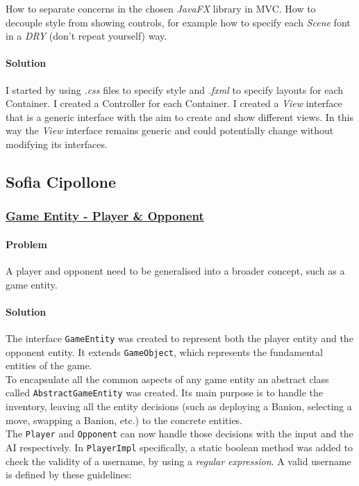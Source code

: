 \documentclass[12pt, a4paper]{report}
\theoremstyle{definition}
\begin{document}
            How to separate concerns in the chosen \emph{JavaFX} library in MVC.
            How to decouple style from showing controls, for example how to specify each \emph{Scene} font in a \emph{DRY} (don't repeat yourself) way.

            \paragraph{Solution}

            I started by using \textit{.css} files to specify style and \textit{.fxml} to specify layouts for each Container.
            I created a Controller for each Container.
            I created a \textit{View} interface that is a generic interface with the aim to create and show different views.
            In this way the \textit{View} interface remains generic and could potentially change without modifying its interfaces.
            
        \pagebreak

    \pagebreak

    \subsection*{Sofia Cipollone}

    \subsubsection{\underline{Game Entity - Player \& Opponent}}
    \paragraph{Problem}
    A player and opponent need to be generalised into a broader concept, such as a game entity.
    \paragraph{Solution}
    The interface \verb|GameEntity| was created to represent both the player entity and the opponent entity.
    It extends \verb|GameObject|, which represents the fundamental entities of the game.\\
    To encapsulate all the common aspects of any game entity an abstract class called \verb|AbstractGameEntity| was created. Its main purpose is to handle the inventory, leaving all the
    entity decisions (such as deploying a Banion, selecting a move, swapping a Banion, etc.) to the concrete entities.\\
    The \verb|Player| and \verb|Opponent| can now handle those decisions with the input and the AI respectively.
    In \verb|PlayerImpl| specifically, a static boolean method was added to check the validity of a username, by using a \textit{regular expression}.
    A valid username is defined by these guidelines:
\end{document}
